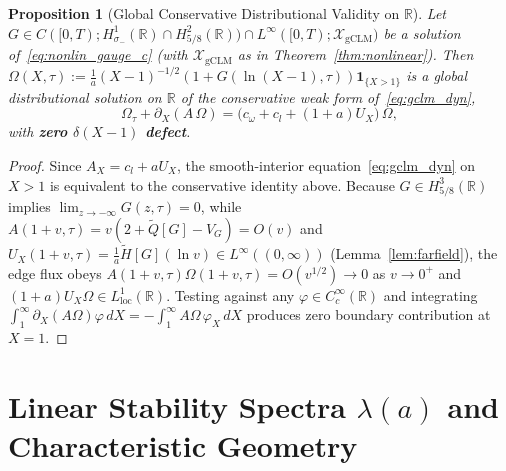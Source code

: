 \documentclass[11pt,a4paper]{article}
\newtheorem{prop}{Proposition}[section]
\begin{document}
\begin{prop}[Global Conservative Distributional Validity on $\mathbb{R}$]\label{prop:weak_form}
Let $G \in C([0,T); H^1_{\sigma_-}(\mathbb{R})\cap H^2_{5/8}(\mathbb{R})) \cap L^\infty([0,T); \mathcal{X}_{\mathrm{gCLM}})$ be a solution of~\eqref{eq:nonlin_gauge_c} (with $\mathcal{X}_{\mathrm{gCLM}}$ as in Theorem~\ref{thm:nonlinear}). Then $\Omega(X,\tau) := \frac{1}{a}(X-1)^{-1/2}(1+G(\ln(X-1),\tau))\mathbf{1}_{\{X>1\}}$ is a global distributional solution on $\mathbb{R}$ of the conservative weak form of~\eqref{eq:gclm_dyn},
\[
\Omega_\tau + \partial_X(A\,\Omega) = \big(c_\omega + c_l + (1+a)U_X\big)\,\Omega,
\]
with \textbf{zero $\delta(X-1)$ defect}.
\end{prop}
\begin{proof}
Since $A_X = c_l + a U_X$, the smooth-interior equation~\eqref{eq:gclm_dyn} on $X > 1$ is equivalent to the conservative identity above. Because $G \in H^3_{5/8}(\mathbb{R})$ implies $\lim_{z\to-\infty}G(z,\tau) = 0$, while $A(1+v,\tau) = v(2 + \widetilde{Q}[G] - V_G) = O(v)$ and $U_X(1+v,\tau) = \frac{1}{a}\widetilde{H}[G](\ln v) \in L^\infty((0,\infty))$ (Lemma~\ref{lem:farfield}), the edge flux obeys $A(1+v,\tau)\Omega(1+v,\tau) = O(v^{1/2}) \to 0$ as $v \to 0^+$ and $(1+a)U_X\Omega \in L^1_{\mathrm{loc}}(\mathbb{R})$. Testing against any $\varphi \in C_c^\infty(\mathbb{R})$ and integrating $\int_1^\infty \partial_X(A\Omega)\varphi\,dX = -\int_1^\infty A\Omega\,\varphi_X\,dX$ produces zero boundary contribution at $X = 1$.
\end{proof}

\section{Linear Stability Spectra \texorpdfstring{$\lambda(a)$}{lambda(a)} and Characteristic Geometry}\label{sec:spectra}
\end{document}
